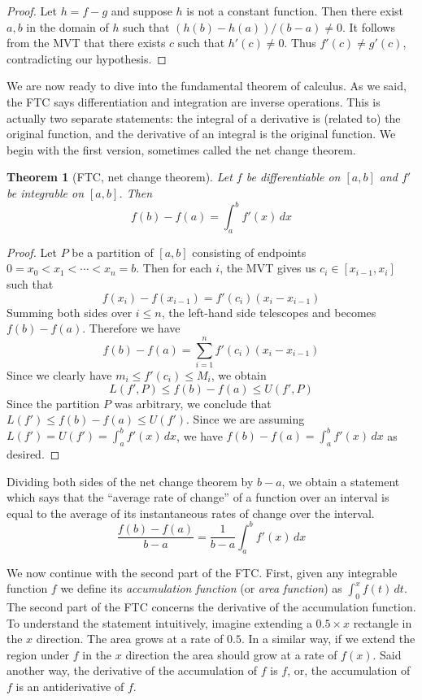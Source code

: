 \documentclass[11pt,oneside]{amsbook}
\theoremstyle{definition}
\theoremstyle{plain}
\newtheorem{theorem}{Theorem}[section]
\theoremstyle{definition}
\theoremstyle{remark}
\numberwithin{equation}{section}
\numberwithin{figure}{section}
\begin{document}
\begin{proof}
  Let $h=f-g$ and suppose $h$ is not a constant function. Then there exist $a,b$ in the domain of $h$ such that $(h(b)-h(a))/(b-a)\neq0$. It follows from the MVT that there exists $c$ such that $h'(c)\neq0$. Thus $f'(c)\neq g'(c)$, contradicting our hypothesis.
\end{proof}

We are now ready to dive into the fundamental theorem of calculus. As we said, the FTC says differentiation and integration are inverse operations. This is actually two separate statements: the integral of a derivative is (related to) the original function, and the derivative of an integral is the original function. We begin with the first version, sometimes called the net change theorem.

\begin{theorem}[FTC, net change theorem]
  Let $f$ be differentiable on $[a,b]$ and $f'$ be integrable on $[a,b]$. Then
  \[f(b)-f(a)=\int_a^b f'(x)\,dx
  \]
\end{theorem}

\begin{proof}
  Let $P$ be a partition of $[a,b]$ consisting of endpoints $0=x_0<x_1<\cdots<x_n=b$. Then for each $i$, the MVT gives us $c_i\in[x_{i-1},x_i]$ such that
  \[f(x_i)-f(x_{i-1})=f'(c_i)(x_i-x_{i-1})
  \]
  Summing both sides over $i\leq n$, the left-hand side telescopes and becomes $f(b)-f(a)$. Therefore we have
  \[f(b)-f(a)=\sum_{i=1}^n f'(c_i)(x_i-x_{i-1})
  \]
  Since we clearly have $m_i\leq f'(c_i)\leq M_i$, we obtain
  \[L(f',P)\leq f(b)-f(a)\leq U(f',P)
  \]
  Since the partition $P$ was arbitrary, we conclude that $L(f')\leq f(b)-f(a)\leq U(f')$. Since we are assuming $L(f')=U(f')=\int_a^bf'(x)\,dx$, we have $f(b)-f(a)=\int_a^bf'(x)\,dx$ as desired.
\end{proof}

Dividing both sides of the net change theorem by $b-a$, we obtain a statement which says that the ``average rate of change'' of a function over an interval is equal to the average of its instantaneous rates of change over the interval.
\[\frac{f(b)-f(a)}{b-a}=\frac{1}{b-a}\int_a^b f'(x)\,dx
\]

We now continue with the second part of the FTC. First, given any integrable function $f$ we define its \emph{accumulation function} (or \emph{area function}) as $\int_0^xf(t)\,dt$. The second part of the FTC concerns the derivative of the accumulation function. To understand the statement intuitively, imagine extending a $0.5\times x$ rectangle in the $x$ direction. The area grows at a rate of $0.5$. In a similar way, if we extend the region under $f$ in the $x$ direction the area should grow at a rate of $f(x)$. Said another way, the derivative of the accumulation of $f$ is $f$, or, the accumulation of $f$ is an antiderivative of $f$.
\end{document}
